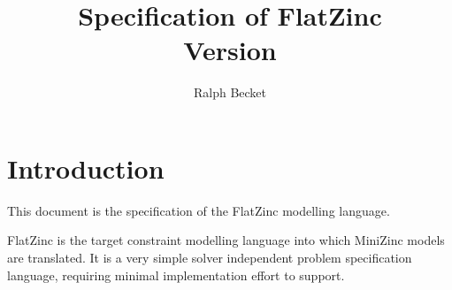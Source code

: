 \documentclass[a4paper]{article}
\title{Specification of FlatZinc \\
\smallskip
\Large{Version \mznversion}
}
\author{Ralph Becket}
\date{}
\begin{document}
\maketitle

\newcommand{\fz}[1]{\texttt{#1}}
\newcommand{\fzsf}[1]{\ensuremath{\mathsf{#1}}}
\newcommand{\fzra}{\ensuremath{r_1}}
\newcommand{\fzrb}{\ensuremath{r_2}}
\newcommand{\fzxa}{\ensuremath{x_1}}
\newcommand{\fzxb}{\ensuremath{x_2}}
\newcommand{\fzxk}{\ensuremath{x_k}}
\newcommand{\fzxi}{\ensuremath{x_i}}
\newcommand{\fzya}{\ensuremath{y_1}}
\newcommand{\fzyb}{\ensuremath{y_2}}
\newcommand{\fzyk}{\ensuremath{y_k}}
\newcommand{\fzyi}{\ensuremath{y_i}}
\newcommand{\fzn}{\ensuremath{n}}
\newcommand{\fzv}{\ensuremath{v}}
\newcommand{\fzvj}{\ensuremath{v[j]}}
\newcommand{\fzi}{\ensuremath{i}}
\newcommand{\fzj}{\ensuremath{j}}
\newcommand{\fzk}{\ensuremath{k}}
\newcommand{\fzpredname}{\fzsf{predname}}
\newcommand{\fztype}{\fzsf{type}}
\newcommand{\fzparamtype}{\fzsf{paramtype}}
\newcommand{\fzvartype}{\fzsf{vartype}}
\newcommand{\fzargname}{\fzsf{argname}}
\newcommand{\fzvarname}{\fzsf{varname}}
\newcommand{\fzparamname}{\fzsf{paramname}}
\newcommand{\fzarg}{\fzsf{arg}}
\newcommand{\fzobjfn}{\fzsf{objfn}}
\newcommand{\fzvars}{\fzsf{vars}}
\newcommand{\fzliteral}{\fzsf{literal}}
\newcommand{\fzarrayliteral}{\fzsf{arrayliteral}}
\newcommand{\fzannotation}{\fzsf{annotation}}
\newcommand{\fzannotationname}{\fzsf{annotationname}}
\newcommand{\fzannotationarg}{\fzsf{annotationarg}}
\newcommand{\fzsearchannotation}{\fzsf{searchannotation}}
\newcommand{\fzvarchoiceannotation}{\fzsf{varchoiceannotation}}
\newcommand{\fznassignmentannotation}{\fzsf{assignmentannotation}}
\newcommand{\fzstrategyannotation}{\fzsf{strategyannotation}}
\newcommand{\fzbnf}{\fzsf{::=}}
\newcommand{\fzalt}{\fzsf{|}}

\newpage

\tableofcontents

\newpage

\section{Introduction}

This document is the specification of the FlatZinc modelling language.

FlatZinc is the target constraint modelling language into which MiniZinc
models are translated.
It is a very simple solver independent problem specification language,
requiring minimal implementation effort to support.
\end{document}
